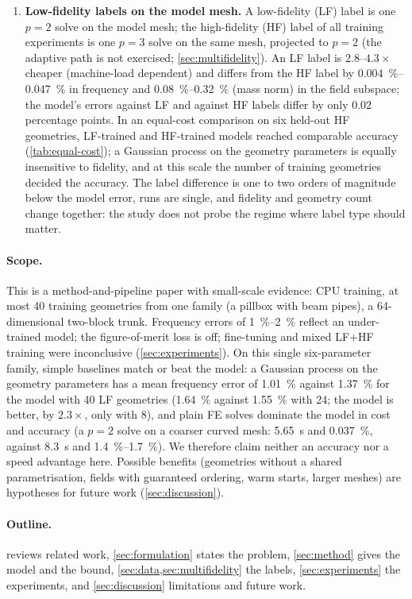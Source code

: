 \begin{enumerate}
  \item \textbf{Low-fidelity labels on the model mesh.}
  A low-fidelity (LF) label is one $p=2$ solve on the model mesh; the high-fidelity (HF) label of all training experiments is one $p=3$ solve on the same mesh, projected to $p=2$ (the adaptive path is not exercised; \cref{sec:multifidelity}). %
  An LF label is $2.8$--$4.3\times$ cheaper (machine-load dependent) %
  and differs from the HF label by \SIrange{0.004}{0.047}{\percent} in frequency and \SIrange{0.08}{0.32}{\percent} (mass norm) in the field subspace; %
  the model's errors against LF and against HF labels differ by only $0.02$ percentage points. %
  In an equal-cost comparison on six held-out HF geometries, LF-trained and HF-trained models reached comparable accuracy (\cref{tab:equal-cost}); a Gaussian process on the geometry parameters is equally insensitive to fidelity, and at this scale the number of training geometries decided the accuracy. %
  The label difference is one to two orders of magnitude below the model error, runs are single, and fidelity and geometry count change together: the study does not probe the regime where label type should matter. %
\end{enumerate}

\paragraph{Scope.}
This is a method-and-pipeline paper with small-scale evidence: CPU training, at most 40 training geometries from one family (a pillbox with beam pipes), a 64-dimensional two-block trunk. %
Frequency errors of \SIrange{1}{2}{\percent} reflect an under-trained model; the figure-of-merit loss is off; fine-tuning and mixed LF+HF training were inconclusive (\cref{sec:experiments}).
On this single six-parameter family, simple baselines match or beat the model: a Gaussian process on the geometry parameters has a mean frequency error of \SI{1.01}{\percent} against \SI{1.37}{\percent} for the model with 40 LF geometries (\SI{1.64}{\percent} against \SI{1.55}{\percent} with 24; the model is better, by $2.3\times$, only with 8), and plain FE solves dominate the model in cost and accuracy (a $p=2$ solve on a coarser curved mesh: \SI{5.65}{s} and \SI{0.037}{\percent}, against \SI{8.3}{s} and \SIrange{1.4}{1.7}{\percent}). %
We therefore claim neither an accuracy nor a speed advantage here.
Possible benefits (geometries without a shared parametrisation, fields with guaranteed ordering, warm starts, larger meshes) are hypotheses for future work (\cref{sec:discussion}).

\paragraph{Outline.}
 reviews related work, \cref{sec:formulation} states the problem, \cref{sec:method} gives the model and the bound, \cref{sec:data,sec:multifidelity} the labels, \cref{sec:experiments} the experiments, and \cref{sec:discussion} limitations and future work.

